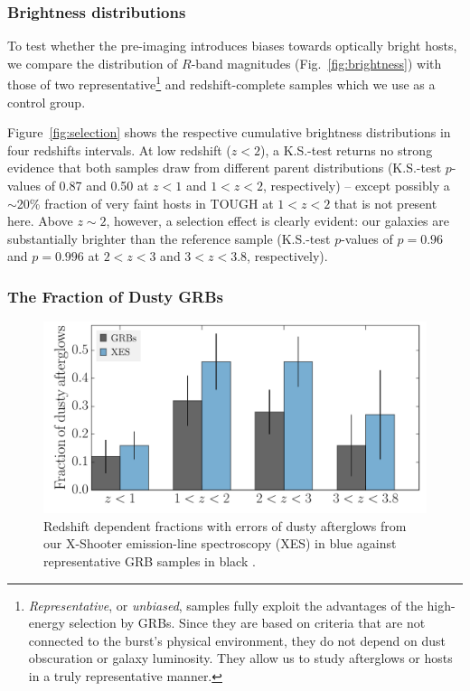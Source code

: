 \documentclass[traditabstract, longauth]{aa}
\begin{document}
\subsubsection{Brightness distributions}
\label{sec:bdist}

 {To test whether the pre-imaging introduces biases towards optically bright hosts, we compare the distribution of $R$-band magnitudes (Fig.~\ref{fig:brightness}) with those of two representative\footnote{\textit{Representative}, or \textit{unbiased}, samples fully exploit the advantages of the high-energy selection by GRBs. Since they are based on criteria that are not connected to the burst's physical environment, they do not depend on dust obscuration or galaxy luminosity. They allow us to study afterglows or hosts in a truly representative manner.} and redshift-complete samples \citep{2012ApJ...756..187H, 2014arXiv1409.7064V} which we use as a control group.}
 
 {Figure~\ref{fig:selection} shows the respective cumulative brightness distributions in four redshifts intervals. At low redshift ($z<2$), a K.S.-test returns no strong evidence that both samples draw from different parent distributions (K.S.-test $p$-values of 0.87 and 0.50 at $z<1$ and $1<z<2$, respectively) -- except possibly a $\sim$20\% fraction of very faint hosts in TOUGH at $1<z<2$ that is not present here. Above $z \sim 2$, however, a selection effect is clearly evident: our galaxies are substantially brighter than the reference sample (K.S.-test $p$-values of $p=0.96$ and $p=0.996$ at $2<z<3$ and $3<z<3.8$, respectively).}

\subsubsection{The Fraction of Dusty GRBs}
\label{sec:dusty}

\begin{figure}
\includegraphics[angle=0, width=0.99\columnwidth]{Figs/DustyFrac.pdf}
\caption{Redshift dependent fractions with errors of dusty afterglows from our X-Shooter emission-line spectroscopy (XES) in blue against representative GRB samples in black \citep{2011A&A...526A..30G, 2013MNRAS.432.1231C}.}
\label{fig:dustyfrac}
\end{figure}
\end{document}
